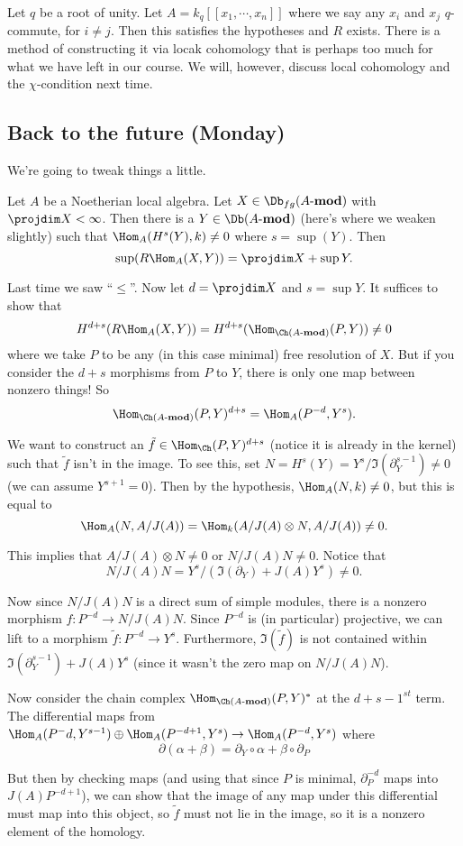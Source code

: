 \documentclass[12pt]{article}
\newcommand*{\Amod}{A\text{-}\mathbf{mod}}
\begin{document}
\begin{ex}
	Let $q$ be a root of unity. Let $A=k_q[[x_1,\cdots,x_n]]$ where we say any $x_i$ and $x_j$ $q$-commute, for $i\ne j$. Then this satisfies the hypotheses and $R$ exists.
	There is a method of constructing it via locak cohomology that is perhaps too much for what we have left in our course. We will, however, discuss local 
	cohomology and the $\chi$-condition next time.
\end{ex}

\subsection{Back to the future (Monday)}
We're going to tweak things a little.
\begin{thm}
	Let $A$ be a Noetherian local algebra. Let $X\in\Db_{fg}(\Amod)$ with $\projdim X<\infty$.
	Then there is a $Y\in\Db(\Amod)$ (here's where we weaken slightly) such that $\Hom_A(H^s(Y),k)\ne 0$ where 
	$s=\sup(Y)$. Then 
	\[\sup(R\Hom_A(X,Y))=\projdim X+\sup Y.\]
\end{thm}
\begin{prf}
	Last time we saw ``$\le$''. Now let $d=\projdim X$ and $s=\sup Y$. It suffices to show that
	\[H^{d+s}(R\Hom_A(X,Y))=H^{d+s}(\Hom_{\Ch(\Amod)}(P,Y))\ne 0\]
	where we take $P$ to be any (in this case minimal) free resolution of $X$. But if you consider the $d+s$ morphisms from $P$ to $Y$,
	there is only one map between nonzero things! So 
	\[\Hom_{\Ch(\Amod)}(P,Y)^{d+s}=\Hom_A(P^{-d},Y^s).\]

	We want to construct an $\tilde f\in\Hom_{\Ch}(P,Y)^{d+s}$ (notice it is already in the kernel) such that $\tilde f$ isn't in the image. To see this, 
	set $N=H^s(Y)=Y^s/\Im(\partial_Y^{s-1})\ne 0$ (we can assume $Y^{s+1}=0$). Then by the hypothesis, $\Hom_A(N,k)\ne 0$,
	but this is equal to 
	\[\Hom_A(N,A/J(A))=\Hom_k(A/J(A)\otimes N, A/J(A))\ne 0.\]

	This implies that $A/J(A)\otimes N\ne 0$ or $N/J(A)N\ne 0$. Notice that
	\[N/J(A)N=Y^s/(\Im(\partial_Y)+J(A)Y^s)\ne 0.\]

	Now since $N/J(A)N$ is a direct sum of simple modules, there is a nonzero morphism $f:P^{-d}\to N/J(A)N$. Since $P^{-d}$ is 
	(in particular) projective, we can lift to a morphism $\tilde f:P^{-d}\to Y^s$. Furthermore, $\Im(\tilde f)$ is not contained within
	$\Im(\partial_Y^{s-1})+J(A)Y^s$ (since it wasn't the zero map on $N/J(A)N$).

	Now consider the chain complex $\Hom_{\Ch(\Amod)}(P,Y)^\ast$ at the $d+s-1^{st}$ term. The differential maps from 
	$\Hom_A(P^-d,Y^{s-1})\oplus\Hom_A(P^{-d+1},Y^s)\to \Hom_A(P^{-d},Y^s)$ where 
	\[\partial(\alpha+\beta)=\partial_Y\circ\alpha+\beta\circ\partial_P\]

	But then by checking maps (and using that since $P$ is minimal, $\partial_P^{-d}$ maps into $J(A)P^{-d+1}$), we can 
	show that the image of any map under this differential must map into this object, so $\tilde f$ must not lie in the image, 
	so it is a nonzero element of the homology.
\end{prf}
\end{document}
